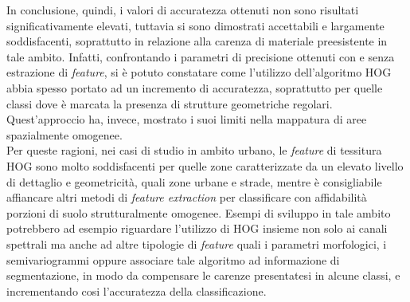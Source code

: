 In conclusione, quindi, i valori di accuratezza ottenuti non sono risultati significativamente elevati, tuttavia si sono dimostrati accettabili e largamente soddisfacenti, soprattutto in relazione alla carenza di materiale preesistente in tale ambito. 
Infatti, confrontando i parametri di precisione ottenuti con e senza estrazione di \emph{feature}, si è potuto constatare come l'utilizzo dell'algoritmo HOG abbia spesso portato ad un incremento di accuratezza, soprattutto per quelle classi dove è marcata la presenza di strutture geometriche regolari. 
Quest'approccio ha, invece, mostrato i suoi limiti nella mappatura di aree spazialmente omogenee.\\
Per queste ragioni, nei casi di studio in ambito urbano, le \emph{feature} di tessitura HOG sono molto soddisfacenti per quelle zone caratterizzate da un elevato livello di dettaglio e geometricità, quali zone urbane e strade, mentre è consigliabile affiancare altri metodi di \emph{feature extraction} per classificare con affidabilità porzioni di suolo strutturalmente omogenee. Esempi di sviluppo in tale ambito potrebbero ad esempio riguardare l'utilizzo di HOG insieme non solo ai canali spettrali ma anche ad altre tipologie di \emph{feature} quali i parametri morfologici, i semivariogrammi oppure associare tale algoritmo ad informazione di segmentazione, in modo da compensare le carenze presentatesi in alcune classi, e incrementando cosi l'accuratezza della classificazione.

